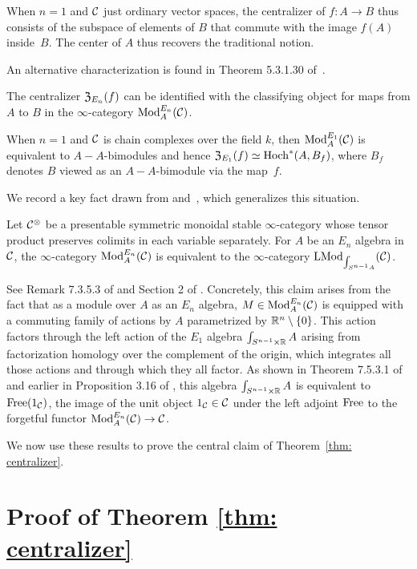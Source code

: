 \documentclass[11pt]{amsart}
\numberwithin{equation}{section}
\begin{document}
When $n=1$ and $\mathcal C$ just ordinary vector spaces, the centralizer of $f: A \to B$ thus consists of the subspace of elements of $B$ that commute with the image $f(A)$ inside~$B$.
The center of $A$ thus recovers the traditional notion.

An alternative characterization is found in Theorem 5.3.1.30 of~\cite{LurieHA}.

\begin{prp}
The centralizer ${\frak Z}_{E_n}(f)$ can be identified with the classifying object for maps from $A$ to $B$ in the $\infty$-category ${\rm Mod}^{E_n}_A(\mathcal C)$.
\end{prp}

When $n=1$ and $\mathcal C$ is chain complexes over the field $k$, 
then ${\rm Mod}^{E_1}_A(\mathcal C)$ is equivalent to $A-A$-bimodules and hence ${\frak Z}_{E_1}(f) \simeq {\rm Hoch}^*(A,B_f)$,
where $B_f$ denotes $B$ viewed as an $A-A$-bimodule via the map~$f$.

We record a key fact drawn from \cite{LurieHA} and~\cite{FrancisHH}, which generalizes this situation.

\begin{prp}
Let $\mathcal C^\otimes$ be a presentable symmetric monoidal stable $\infty$-category whose tensor product preserves colimits in each variable separately.
For $A$ be an $E_n$ algebra in $\mathcal C$,
the $\infty$-category ${\rm Mod}^{E_n}_A(\mathcal C)$ is equivalent to the $\infty$-category ${\rm LMod}_{\int_{S^{n-1} A}}(\mathcal C)$.
\end{prp}

See Remark 7.3.5.3 of \cite{LurieHA} and Section 2 of \cite{FrancisHH}.
Concretely, this claim arises from the fact that as a module over $A$ as an $E_n$ algebra, 
$M \in {\rm Mod}^{E_n}_A(\mathcal C)$ is equipped with a commuting family of actions by $A$ parametrized by $\mathbb R^n \setminus \{0\}$.
This action factors through the left action of the $E_1$ algebra $\int_{S^{n-1} \times \mathbb R} A$ arising from factorization homology over the complement of the origin,
which integrates all those actions and through which they all factor.
As shown in Theorem 7.5.3.1 of \cite{LurieHA} and earlier in Proposition 3.16 of \cite{FrancisHH}, 
this algebra $\int_{S^{n-1} \times \mathbb R} A$ is equivalent to ${\rm Free}(1_\mathcal C)$, 
the image of the unit object $1_\mathcal C \in \mathcal C$ under the left adjoint ${\rm Free}$ to the forgetful functor ${\rm Mod}^{E_n}_A(\mathcal C) \to \mathcal C$.

We now use these results to prove the central claim of Theorem~\ref{thm: centralizer}.

\section{Proof of Theorem \ref{thm: centralizer}}
\end{document}
